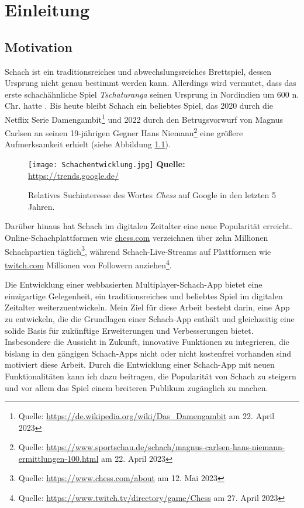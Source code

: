 \chapter{Einleitung}
    \section{Motivation}
    Schach ist ein traditionsreiches und abwechslungsreiches Brettspiel, dessen Ursprung nicht genau bestimmt werden kann. Allerdings wird vermutet, dass das erste schachähnliche Spiel  \textit{Tschaturanga} seinen Ursprung in Nordindien um 600 n. Chr. hatte \cite{schachgeschichte}. Bis heute bleibt Schach ein beliebtes Spiel, das 2020 durch die Netflix Serie \glqq Damengambit\grqq \footnote{Quelle: \url{https://de.wikipedia.org/wiki/Das_Damengambit} am 22. April 2023} und 2022 durch den Betrugsvorwurf von Magnus Carlsen an seinen 19-jährigen Gegner Hans Niemann\footnote{Quelle: \url{https://www.sportschau.de/schach/magnus-carlsen-hans-niemann-ermittlungen-100.html} am 22. April 2023} eine größere Aufmerksamkeit erhielt (siehe Abbildung \ref{fig:Schachinteresse}). 
    
    \begin{figure}[ht]
\raggedleft
  \texttt{[image: Schachentwicklung.jpg]}
    \footnotesize\sffamily\textbf{Quelle:} \url{https://trends.google.de/}
  \caption{Relatives Suchinteresse des Wortes \textit{Chess} auf Google in den letzten 5 Jahren.}
  \label{fig:Schachinteresse}
\end{figure}

     Darüber hinaus hat Schach im digitalen Zeitalter eine neue Popularität erreicht. Online-Schachplattformen wie \url{chess.com} verzeichnen über zehn Millionen Schachpartien täglich\footnote{Quelle: \url{https://www.chess.com/about} am 12. Mai 2023}, während Schach-Live-Streams auf Plattformen wie \url{twitch.com} Millionen von Followern anziehen\footnote{Quelle: \url{https://www.twitch.tv/directory/game/Chess} am 27. April 2023}.
     
Die Entwicklung einer webbasierten Multiplayer-Schach-App bietet eine einzigartige Gelegenheit, ein traditionsreiches und beliebtes Spiel im digitalen Zeitalter weiterzuentwickeln. Mein Ziel für diese Arbeit besteht darin, eine App zu entwickeln, die die Grundlagen einer Schach-App enthält und gleichzeitig eine solide Basis für zukünftige Erweiterungen und Verbesserungen bietet.
Insbesondere die Aussicht in Zukunft, innovative Funktionen zu integrieren, die bislang in den gängigen Schach-Apps nicht oder nicht kostenfrei vorhanden sind motiviert diese Arbeit. Durch die Entwicklung einer Schach-App mit neuen Funktionalitäten kann ich dazu beitragen, die Popularität von Schach zu steigern und vor allem das Spiel einem breiteren Publikum zugänglich zu machen.
